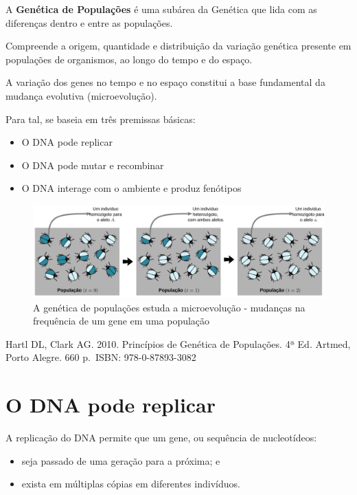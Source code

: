 \documentclass[
]{book}
\begin{document}
A \textbf{Genética de Populações} é uma subárea da Genética que lida com as diferenças dentro e entre as populações.

Compreende a origem, quantidade e distribuição da variação genética presente em populações de organismos, ao longo do tempo e do espaço.

A variação dos genes no tempo e no espaço constitui a base fundamental da mudança evolutiva (microevolução).

Para tal, se baseia em três premissas básicas:

\begin{itemize}
\item
  O DNA pode replicar
\item
  O DNA pode mutar e recombinar
\item
  O DNA interage com o ambiente e produz fenótipos
\end{itemize}

\begin{figure}

{\centering \includegraphics[width=800px]{figs/microevolution_scheme} 

}

\caption{A genética de populações estuda a microevolução - mudanças na frequência de um gene em uma população}\label{fig:microevolucao}
\end{figure}

Hartl DL, Clark AG. 2010. Princípios de Genética de Populações. 4ª Ed. Artmed, Porto Alegre. 660 p.~ISBN: 978-0-87893-3082

\hypertarget{o-dna-pode-replicar}{%
\section{O DNA pode replicar}\label{o-dna-pode-replicar}}

A replicação do DNA permite que um gene, ou sequência de nucleotídeos:

\begin{itemize}
\item
  seja passado de uma geração para a próxima; e
\item
  exista em múltiplas cópias em diferentes indivíduos.
\end{itemize}
\end{document}
